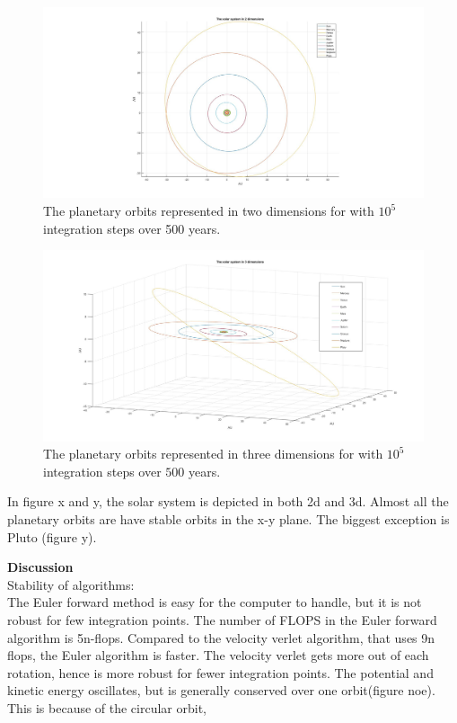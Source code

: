 \documentclass[10pt,a4paper]{article}
\begin{document}
\begin{figure} [H]  
\centerline{\includegraphics[scale=0.40]{2dsolsys.jpg}}
\caption{The planetary orbits represented in two dimensions for with $10^5$ integration steps over 500 years.}
\end{figure}



\begin{figure} [H]

\centerline{\includegraphics[scale=0.35]{3dsolsys.jpg}}
\caption{The planetary orbits represented in three dimensions for with $10^5$ integration steps over $500$ years.}

\end{figure}

In figure x and y, the solar system is depicted in both 2d and 3d. Almost all the planetary orbits are have stable orbits in the x-y plane. The biggest exception is Pluto (figure y). 

\newpage
{\LARGE\bf
Discussion
}
\\
Stability of algorithms:\\


\noindent The Euler forward method is easy for the computer to handle, but it is not robust for few integration points. The number of FLOPS in the Euler forward algorithm is 5n-flops. Compared to the velocity verlet algorithm, that uses 9n flops, the Euler algorithm is faster. The velocity verlet gets more out of each rotation, hence is more robust for fewer integration points. The potential and kinetic energy oscillates, but is generally conserved over one orbit(figure noe). This is because of the circular orbit,  \\
\end{document}
